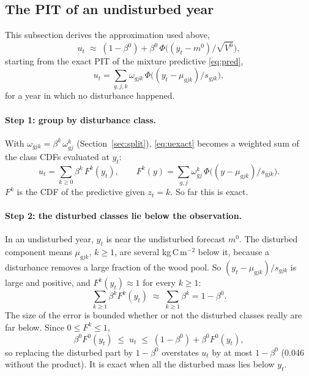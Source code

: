\documentclass[11pt]{article}
\begin{document}
\subsection{The PIT of an undisturbed year}
\label{sec:pit-approx}

This subsection derives the approximation used above,
\begin{equation}
  u_t \;\approx\; (1 - \beta^0) + \beta^0\,\Phi\!\big((y_t - m^0)/\sqrt{V^0}\big),
  \label{eq:uapprox}
\end{equation}
starting from the exact PIT of the mixture predictive \eqref{eq:pred},
\begin{equation}
  u_t = \sum_{g,j,k}\omega_{gjk}\,\Phi\!\big((y_t - \mu_{gjk})/s_{gjk}\big),
  \label{eq:uexact}
\end{equation}
for a year in which no disturbance happened.

\paragraph{Step 1: group by disturbance class.}
With $\omega_{gjk} = \beta^k\,\omega^k_{gj}$ (Section~\ref{sec:split}), \eqref{eq:uexact} becomes a
weighted sum of the class CDFs evaluated at $y_t$:
\begin{equation}
  u_t = \sum_{k \ge 0}\beta^k\,F^k(y_t), \qquad
  F^k(y) = \sum_{g,j}\omega^k_{gj}\,\Phi\!\big((y - \mu_{gjk})/s_{gjk}\big).
  \label{eq:uclass}
\end{equation}
$F^k$ is the CDF of the predictive given $z_t = k$. So far this is exact.

\paragraph{Step 2: the disturbed classes lie below the observation.}
In an undisturbed year, $y_t$ is near the undisturbed forecast $m^0$. The disturbed component means
$\mu_{gjk}$, $k \ge 1$, are several kg\,C\,m$^{-2}$ below it, because a disturbance removes
a large fraction of the wood pool. So $(y_t - \mu_{gjk})/s_{gjk}$ is large and positive, and
$F^k(y_t) \approx 1$ for every $k \ge 1$:
\begin{equation}
  \sum_{k \ge 1}\beta^k F^k(y_t) \;\approx\; \sum_{k \ge 1}\beta^k = 1 - \beta^0 .
  \label{eq:step2}
\end{equation}
The size of the error is bounded whether or not the disturbed classes really are far below. Since
$0 \le F^k \le 1$,
\begin{equation}
  \beta^0 F^0(y_t) \;\le\; u_t \;\le\; (1 - \beta^0) + \beta^0 F^0(y_t),
  \label{eq:bounds}
\end{equation}
so replacing the disturbed part by $1 - \beta^0$ overstates $u_t$ by at most
$1 - \beta^0$ (0.046 without the product). It is exact when all the disturbed mass lies below $y_t$.
\end{document}
